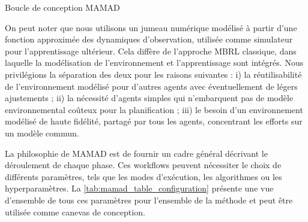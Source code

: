 \documentclass[pdflatex,sn-mathphys-num]{sn-jnl}%
\theoremstyle{thmstyleone}%
\theoremstyle{thmstyletwo}%
\theoremstyle{thmstylethree}%
\begin{document}
\begin{algorithm}[H]
    \caption{Boucle de conception MAMAD}
    \label{alg:mamad-loop}
    \DontPrintSemicolon
\end{algorithm}

On peut noter que nous utilisons un jumeau numérique modélisé à partir d'une fonction approximée des dynamiques d'observation, utilisée comme simulateur pour l'apprentissage ultérieur. Cela diffère de l'approche MBRL classique, dans laquelle la modélisation de l'environnement et l'apprentissage sont intégrés. Nous privilégions la séparation des deux pour les raisons suivantes :  
i) la réutilisabilité de l'environnement modélisé pour d'autres agents avec éventuellement de légers ajustements ;  
ii) la nécessité d'agents simples qui n'embarquent pas de modèle environnemental coûteux pour la planification ;  
iii) le besoin d'un environnement modélisé de haute fidélité, partagé par tous les agents, concentrant les efforts sur un modèle commun.

La philosophie de MAMAD est de fournir un cadre général décrivant le déroulement de chaque phase. Ces workflows peuvent nécessiter le choix de différents paramètres, tels que les modes d'exécution, les algorithmes ou les hyperparamètres. La \autoref{tab:mamad_table_configuration} présente une vue d'ensemble de tous ces paramètres pour l'ensemble de la méthode et peut être utilisée comme canevas de conception.
\end{document}
